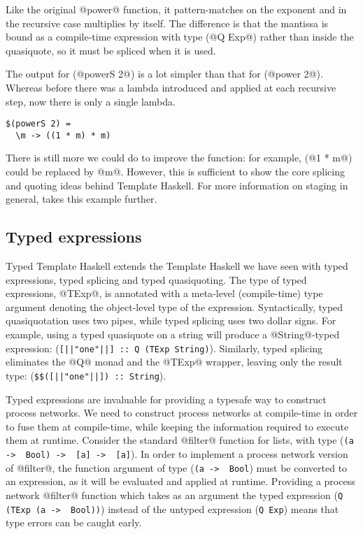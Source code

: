 Like the original @power@ function, it pattern-matches on the exponent and in the recursive case multiplies by itself.
The difference is that the mantissa is bound as a compile-time expression with type (@Q Exp@) rather than inside the quasiquote, so it must be spliced when it is used.

The output for (@powerS 2@) is a lot simpler than that for (@power 2@).
Whereas before there was a lambda introduced and applied at each recursive step, now there is only a single lambda.

\begin{lstlisting}
$(powerS 2) =
  \m -> ((1 * m) * m)
\end{lstlisting}

There is still more we could do to improve the function: for example, (@1 * m@) could be replaced by @m@.
However, this is sufficient to show the core splicing and quoting ideas behind Template Haskell.
For more information on staging in general, \citet{rompf2010lightweight} takes this example further.

\subsection{Typed expressions}


Typed Template Haskell extends the Template Haskell we have seen with typed expressions, typed splicing and typed quasiquoting.
The type of typed expressions, @TExp@, is annotated with a meta-level (compile-time) type argument denoting the object-level type of the expression.
Syntactically, typed quasiquotation uses two pipes, while typed splicing uses two dollar signs.
For example, using a typed quasiquote on a string will produce a @String@-typed expression: (\lstinline/[||"one"||] :: Q (TExp String)/).
Similarly, typed splicing eliminates the @Q@ monad and the @TExp@ wrapper, leaving only the result type: (\lstinline/$$([||"one"||]) :: String/).

Typed expressions are invaluable for providing a typesafe way to construct process networks.
We need to construct process networks at compile-time in order to fuse them at compile-time, while keeping the information required to execute them at runtime.
Consider the standard @filter@ function for lists, with type (\lstinline/(a ->  Bool) ->  [a] ->  [a]/).
In order to implement a process network version of @filter@, the function argument of type (\lstinline/(a ->  Bool/) must be converted to an expression, as it will be evaluated and applied at runtime.
Providing a process network @filter@ function which takes as an argument the typed expression (\lstinline/Q (TExp (a ->  Bool))/) instead of the untyped expression (\lstinline/Q Exp/) means that type errors can be caught early.


